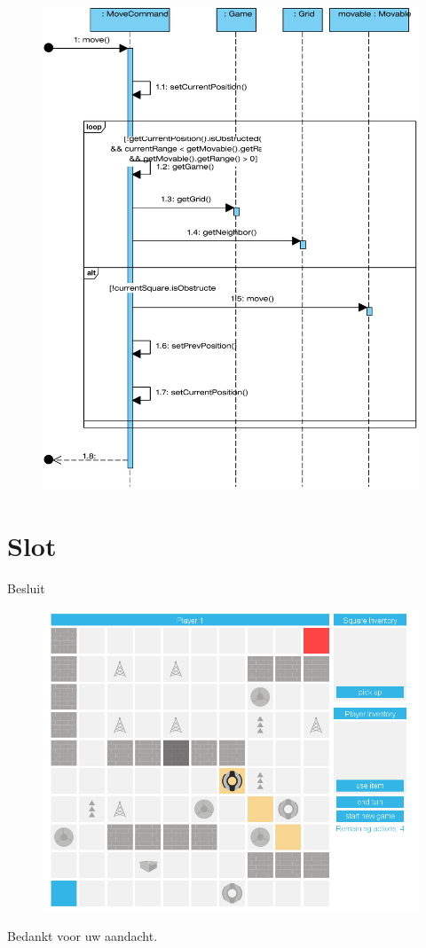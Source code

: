\documentclass[t]{beamer}
\begin{document}
\begin{frame}
\begin{figure}
	\center
	\includegraphics[scale=0.25]{img/movecommand}
\end{figure}
\end{frame}


\section{Slot}
\begin{frame}{Besluit}

\begin{center}
\begin{figure}
\includegraphics[scale=0.2]{img/game}
\end{figure}
\vspace{0.1in}
Bedankt voor uw aandacht.
\end{center}
\end{frame}
\end{document}
